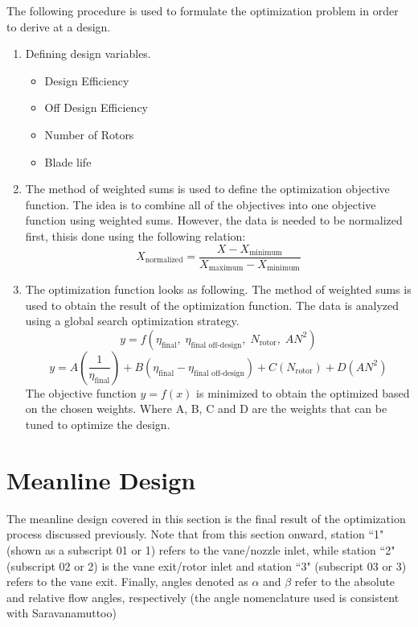 \documentclass[12pt, letter]{report}
\begin{document}
The following procedure is used to formulate the optimization problem in order to derive at a design.
\begin{enumerate}
    \item Defining design variables.
    \begin{itemize}
        \item Design Efficiency
        \item Off Design Efficiency
        \item Number of Rotors
        \item Blade life
    \end{itemize}

    \item The method of weighted sums is used to define the optimization objective function. The idea is to combine all of the objectives into one objective function using weighted sums. However, the data is needed to be normalized first, thisis done using the following relation:
    \begin{equation}
        X_{\text{normalized}} = \frac{X - X_{\text{minimum}}}{X_{\text{maximum}} - X_{\text{minimum}}}
    \end{equation}

    \item The optimization function looks as following. The method of weighted sums is used to obtain the result of the optimization function. The data is analyzed using a global search optimization strategy.
    \begin{equation}
        y = f(\eta_{\text{final}}, \; \eta_{\text{final off-design}}, \; N_{\text{rotor}}, \; AN^2)
    \end{equation}
    \begin{equation}
        y = A \left( \frac{1}{\eta_{\text{final}}} \right) + B(\eta_{\text{final}} - \eta_{\text{final off-design}}) + C(N_{\text{rotor}}) + D(AN^2)
    \end{equation}
    The objective function $y = f(x)$ is minimized to obtain the optimized based on the chosen weights. Where A, B, C and D are the weights that can be tuned to optimize the design.

\end{enumerate}
 


\section{Meanline Design}
The meanline design covered in this section is the final result of the optimization process discussed previously. Note that from this section onward, station ``1" (shown as a subscript 01 or 1) refers to the vane/nozzle inlet, while station ``2" (subscript 02 or 2) is the vane exit/rotor inlet and station ``3" (subscript 03 or 3) refers to the vane exit. Finally, angles denoted as $\alpha$ and $\beta$ refer to the absolute and relative flow angles, respectively (the angle nomenclature used is consistent with Saravanamuttoo)\par
\end{document}
